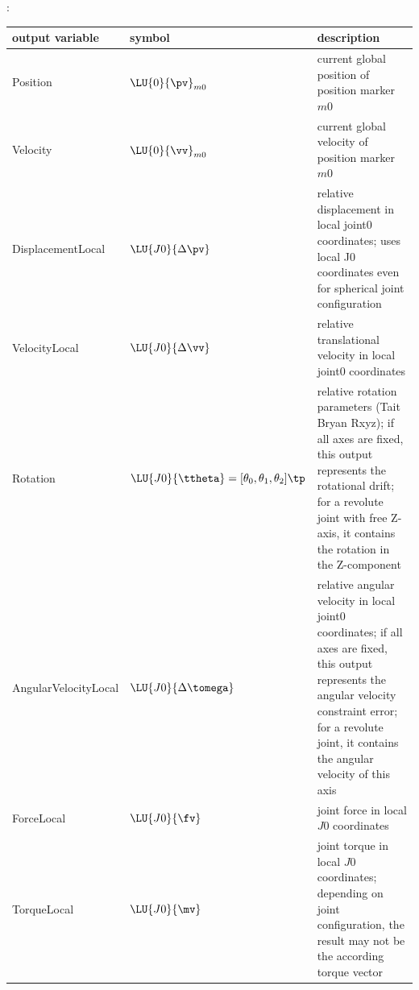 :
\begin{center}
\footnotesize
\begin{longtable}{| p{5cm} | p{5cm} | p{6cm} |} 
\hline
\bf output variable & \bf symbol & \bf description \\ \hline
Position & $\LU{0}{\pv}_{m0}$ & current global position of position marker $m0$\\ \hline
Velocity & $\LU{0}{\vv}_{m0}$ & current global velocity of position marker $m0$\\ \hline
DisplacementLocal & $\LU{J0}{\Delta\pv}$ & relative displacement in local joint0 coordinates; uses local J0 coordinates even for spherical joint configuration\\ \hline
VelocityLocal & $\LU{J0}{\Delta\vv}$ & relative translational velocity in local joint0 coordinates\\ \hline
Rotation & $\LU{J0}{\ttheta}= [\theta_0,\theta_1,\theta_2]\tp$ & relative rotation parameters (Tait Bryan Rxyz); if all axes are fixed, this output represents the rotational drift; for a revolute joint with free Z-axis, it contains the rotation in the Z-component\\ \hline
AngularVelocityLocal & $\LU{J0}{\Delta\tomega}$ & relative angular velocity in local joint0 coordinates; if all axes are fixed, this output represents the angular velocity constraint error; for a revolute joint, it contains the angular velocity of this axis\\ \hline
ForceLocal & $\LU{J0}{\fv}$ & joint force in local $J0$ coordinates\\ \hline
TorqueLocal & $\LU{J0}{\mv}$ & joint torque in local $J0$ coordinates; depending on joint configuration, the result may not be the according torque vector\\ \hline
\end{longtable}
\end{center}
 \noindent
